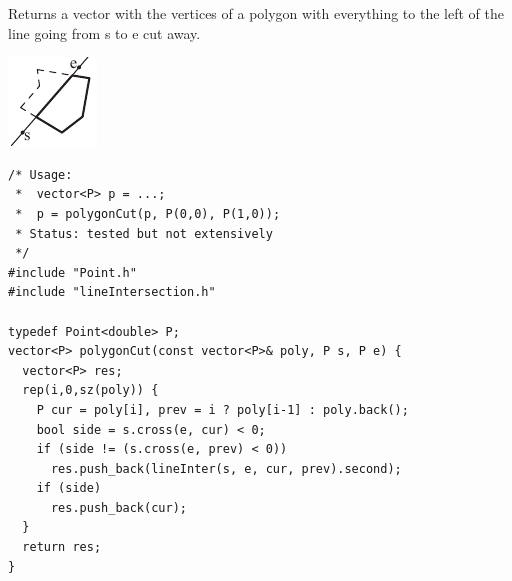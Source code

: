 \begin{minipage}{75mm}
Returns a vector with the vertices of a polygon with everything to the left of the line going from s to e cut away.
\end{minipage}
\begin{minipage}{15mm}
\vspace{-6mm}
\includegraphics[width=\textwidth]{../code/Geometry/Polygon/PolygonCut}
\vspace{-6mm}
\end{minipage}
\begin{verbatim}
/* Usage:
 *  vector<P> p = ...;
 *  p = polygonCut(p, P(0,0), P(1,0));
 * Status: tested but not extensively
 */
#include "Point.h"
#include "lineIntersection.h"

typedef Point<double> P;
vector<P> polygonCut(const vector<P>& poly, P s, P e) {
  vector<P> res;
  rep(i,0,sz(poly)) {
    P cur = poly[i], prev = i ? poly[i-1] : poly.back();
    bool side = s.cross(e, cur) < 0;
    if (side != (s.cross(e, prev) < 0))
      res.push_back(lineInter(s, e, cur, prev).second);
    if (side)
      res.push_back(cur);
  }
  return res;
}
\end{verbatim}